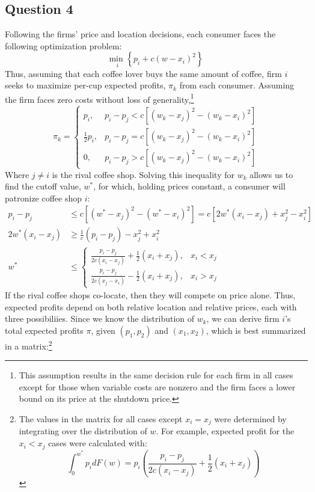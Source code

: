 \documentclass{article}
\newcommand{\usmin}[1]{\underset{#1}{\text{min }}}
\begin{document}
\pagebreak
\subsection*{Question 4}
Following the firms' price and location decisions, each consumer faces the following optimization problem:
\[
	\usmin{i}\left\{p_i + c\left(w-x_i\right)^2\right\}
\]
Thus, assuming that each coffee lover buys the same amount of coffee, firm $i$ seeks to maximize per-cup expected profits, $\pi_k$ from each consumer. Assuming the firm faces zero costs without loss of generality,\footnote{This assumption results in the same decision rule for each firm in all cases except for those when variable costs are nonzero and the firm faces a lower bound on its price at the shutdown price.}
\[
	\pi_k = \begin{cases} 	p_i, & p_i - p_j < c\left[(w_k-x_j)^2 - (w_k-x_i)^2\right] \\ \frac{1}{2}p_i, & p_i - p_j = c\left[(w_k-x_j)^2 - (w_k-x_i)^2\right] \\ 
							0, & p_i - p_j > c\left[(w_k-x_j)^2 - (w_k-x_i)^2\right]	\end{cases}
\]
Where ${j\neq i}$ is the rival coffee shop. Solving this inequality for $w_k$ allows us to find the cutoff value, $w^*$, for which, holding prices constant, a consumer will patronize coffee shop $i$:
\begin{align*}
	p_i - p_j &\leq c\left[(w^*-x_j)^2 - (w^*-x_i)^2\right] = c\left[2w^*(x_i-x_j) + x_j^2-x_i^2\right]	\\
	2w^*(x_i-x_j) &\geq \frac{1}{c}(p_i-p_j) - x_j^2 + x_i^2 	\\
	w^* &\leq 	\begin{cases} 	\frac{p_i - p_j}{2c(x_i - x_j)} + \frac{1}{2}(x_i + x_j), & x_i<x_j \\
								\frac{p_i - p_j}{2c(x_j - x_i)} - \frac{1}{2}(x_i + x_j), & x_i>x_j
				\end{cases}
\end{align*}
If the rival coffee shops co-locate, then they will compete on price alone. Thus, expected profits depend on both relative location and relative prices, each with three possibiliies. Since we know the distribution of $w_k$, we can derive firm $i$'s total expected profits $\pi$, given $(p_1,p_2)$ and $(x_1,x_2)$, which is best summarized in a matrix:\footnote{The values in the matrix for all cases except ${x_i=x_j}$ were determined by integrating over the distribution of $w$. For example, expected profit for the ${x_i<x_j}$ cases were calculated with: $$ \int_0^{w^*}p_idF(w) = p_i\left(\frac{p_i - p_j}{2c(x_i - x_j)} + \frac{1}{2}(x_i + x_j)\right) $$}
\end{document}
